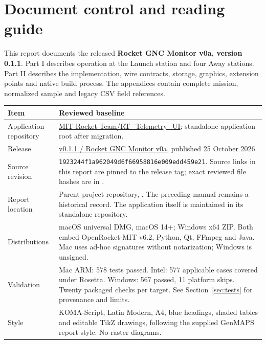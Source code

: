 \section*{Document control and reading guide}
This report documents the released \textbf{Rocket GNC Monitor v0a, version
0.1.1}. Part I describes operation at the Launch station and four Away
stations. Part II describes the implementation, wire contracts, storage,
graphics, extension points and native build process. The appendices contain
complete mission, normalized sample and legacy CSV field references.

\begin{longtable}{@{}L{.24\linewidth}L{.69\linewidth}@{}}
\toprule Item & Reviewed baseline \\\midrule\endhead
Application repository & \href{https://github.com/MIT-Rocket-Team/RT_Telemetry_UI}{MIT-Rocket-Team/RT\_Telemetry\_UI}; standalone application root after migration. \\
Release & \href{https://github.com/MIT-Rocket-Team/RT_Telemetry_UI/releases/tag/v0.1.1}{v0.1.1 / Rocket GNC Monitor v0a}, published 25 October 2026. \\
Source revision & \nolinkurl{1923244f1a962049d6f66958816e009edd459e21}. Source links in this report are pinned to the release tag; exact reviewed file hashes are in . \\
Report location & Parent project repository, . The preceding  manual remains a historical record. The application itself is maintained in its standalone repository. \\
Distributions & macOS universal DMG, macOS 14+; Windows x64 ZIP. Both embed OpenRocket-MIT v6.2, Python, Qt, FFmpeg and Java. Mac uses ad-hoc signatures without notarization; Windows is unsigned. \\
Validation & Mac ARM: 578 tests passed. Intel: 577 applicable cases covered under Rosetta. Windows: 567 passed, 11 platform skips. Twenty packaged checks per target. See Section~\ref{sec:tests} for provenance and limits. \\
Style & KOMA-Script, Latin Modern, A4, blue headings, shaded tables and editable TikZ drawings, following the supplied GenMAPS report style. No raster diagrams. \\
\bottomrule
\end{longtable}



